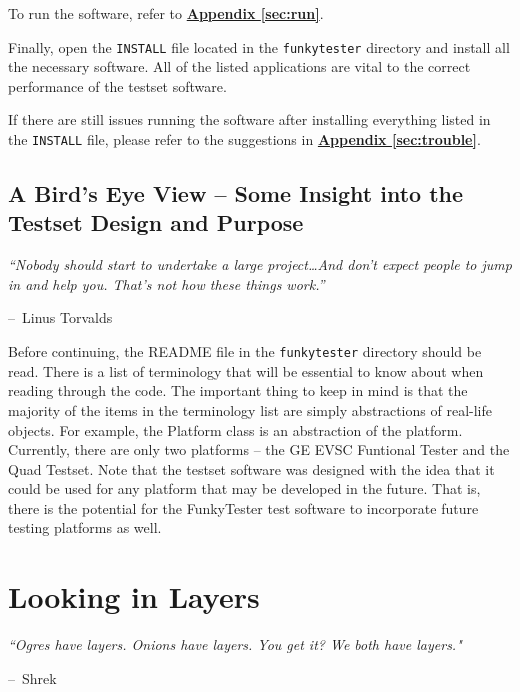 \documentclass{report}
\makeatletter
\newenvironment{chapquote}[2][2em]
  {\setlength{\@tempdima}{#1}%
   \def\chapquote@author{#2}%
   \parshape 1 \@tempdima \dimexpr\textwidth-2\@tempdima\relax%
   \itshape}
  {\par\normalfont\hfill--\ \chapquote@author\hspace*{\@tempdima}\par\bigskip}
\makeatother
\begin{document}
To run the software, refer to \hyperref[sec:run]{\textbf{Appendix \ref{sec:run}}}.

Finally, open the \texttt{INSTALL} file located in the \texttt{funkytester} directory and install all the necessary software. All of the listed applications are vital to the correct performance of the testset software. 

If there are still issues running the software after installing everything listed in the \texttt{INSTALL} file, please refer to the suggestions in \hyperref[sec:trouble]{\textbf{Appendix \ref{sec:trouble}}}.

\section{A Bird's Eye View -- Some Insight into the Testset Design and Purpose}
\begin{chapquote}{Linus Torvalds}
``Nobody should start to undertake a large project\ldots And don't expect people to jump in and help you. That's not how these things work.''
\end{chapquote}

Before continuing, the README file in the \texttt{funkytester} directory should be read. There is a list of terminology that will be essential to know about when reading through the code. The important thing to keep in mind is that the majority of the items in the terminology list are simply abstractions of real-life objects. For example, the Platform class is an abstraction of the platform. Currently, there are only two platforms -- the GE EVSC Funtional Tester and the Quad Testset. Note that the testset software was designed with the idea that it could be used for any platform that may be developed in the future. That is, there is the potential for the FunkyTester test software to incorporate future testing platforms as well.


\chapter{Looking in Layers} 
\begin{chapquote}{Shrek \textit{}}
``Ogres have layers. Onions have layers. You get it? We both have layers."
\end{chapquote}
\end{document}
